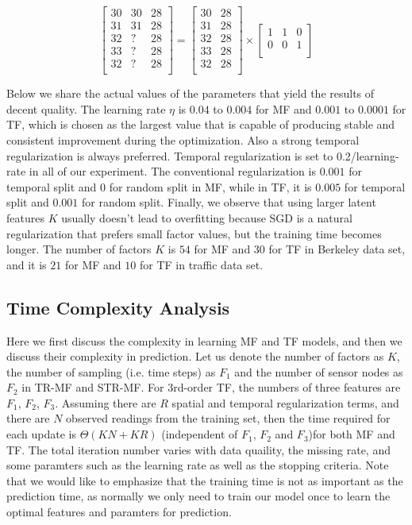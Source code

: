 \begin{equation}
\label{temporalSplit_matrix}
\begin{bmatrix}
30 & 30 & 28\\
31 & 31 & 28\\
32 &  ? & 28\\
33 &  ? & 28\\
32 &  ? & 28\\
\end{bmatrix} 
= 
\begin{bmatrix}
30 & 28\\
31 & 28\\
32 & 28\\
33 & 28\\
32 & 28\\
\end{bmatrix} 
\times
\begin{bmatrix}
1 & 1 & 0\\
0 & 0 & 1\\
\end{bmatrix} 
\end{equation}

Below we share the actual values of the parameters that yield the results of decent quality.
The learning rate $\eta$ is $0.04$ to $0.004$ for MF and $0.001$ to $0.0001$ for TF, which is chosen as the largest value that is capable of producing stable and consistent improvement during the optimization.
Also a strong temporal regularization is always preferred.
Temporal regularization is set to 0.2/learning-rate in all of our experiment.
The conventional regularization is $0.001$ for temporal split and $0$ for random split in MF, while in TF, it is $0.005$ for temporal split and $0.001$ for random split.
Finally, we observe that using larger latent features $K$ usually doesn't lead to overfitting because SGD is a natural regularization that prefers small factor values, but the training time becomes longer.
The number of factors $K$ is $54$ for MF and $30$ for TF in Berkeley data set, and it is $21$ for MF and $10$ for TF in traffic data set. 

\subsection{Time Complexity Analysis}
Here we first discuss the complexity in learning MF and TF models, and then we discuss their complexity in prediction.
Let us denote the number of factors as $K$, the number of sampling (i.e. time steps) as $F_1$ and the number of sensor nodes as $F_2$ in TR-MF and STR-MF. For 3rd-order TF, the numbers of three features are $F_1$, $F_2$, $F_3$.  
Assuming there are $R$ spatial and temporal regularization terms, and there are $N$ observed readings from the training set, then the time required for each update is $\Theta(KN + KR)$ (independent of $F_1$, $F_2$ and $F_3$)for both MF and TF.
The total iteration number varies with data quaility, the missing rate, and some paramters such as the learning rate as well as the stopping criteria. 
Note that we would like to emphasize that the training time is not as important as the prediction time, as normally we only need to train our model once to learn the optimal features and paramters for prediction.

